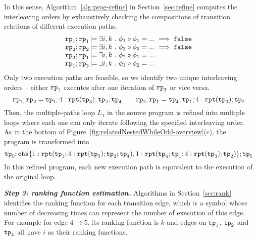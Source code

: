 In this sense, Algorithm~\ref{alg:prog-refine} in Section~\ref{sec:refine} computes the interleaving orders
by exhaustively checking the compositions of transition relations of different execution paths,
\begin{equation}
    \begin{array}{l}
        \mathtt{rp}_1 ; \mathtt{rp}_1 \models \exists i, k ~.~ \phi_1 \circ \phi_1 = ... \implies \mathtt{false}\\
        \mathtt{rp}_2 ; \mathtt{rp}_2 \models \exists i, k ~.~ \phi_2 \circ \phi_2 = ... \implies \mathtt{false} \\
        \mathtt{rp}_2 ; \mathtt{rp}_1 \models \exists i, k ~.~ \phi_2 \circ \phi_1 = ...  \\
        \mathtt{rp}_1 ; \mathtt{rp}_2 \models \exists i, k ~.~ \phi_1 \circ \phi_2 = ... 
    \end{array}
\end{equation}
Only two execution paths are feasible, so we identify two unique interleaving orders --
either $\mathtt{rp}_1$ executes after one iteration of $\mathtt{rp}_2$ or vice versa.
\[
    \mathtt{rp}_1 ; \mathtt{rp}_2 = \mathtt{tp}_1; 4:\mathtt{rpt}(\mathtt{tp}_3); \mathtt{tp}_2; \mathtt{tp}_4
    \qquad
    \mathtt{rp}_2 ; \mathtt{rp}_1 = \mathtt{tp}_4; \mathtt{tp}_1; 4:\mathtt{rpt}(\mathtt{tp}_3); \mathtt{tp}_2
\]
Then, the multiple-paths loop $L_1$ in the source program is refined
into multiple loops where each one can only iterate following the specified interleaving order.
As in the bottom of Figure~\ref{fig:relatedNestedWhileOdd-overview}(c),
the program is transformed into 
\[
    \tpath_0 ; \rpchoose{ 1: \rprepeat(\tpath_1; 4:\rprepeat(\tpath_3); \tpath_2; \tpath_4), 
1: \rprepeat(\tpath_4; \tpath_1; 4:\rprepeat(\tpath_3); \tpath_2) }; \tpath_5
\]
In this refined program, 
each new execution path is equivalent to the execution of the original loop. 

\textbf{\emph{Step 3: ranking function estimation.}}
Algorithms in Section~\ref{sec:rank} identifies the ranking function for each transition edge, which is a symbol whose number of decreasing times can represent the number of execution of this edge.
For example for edge $4 \to 5$, its ranking function is $k$ and edges on $\mathtt{tp}_1$, $\mathtt{tp}_2$ and $\mathtt{tp}_4$ all have $i$ as their ranking functions.

